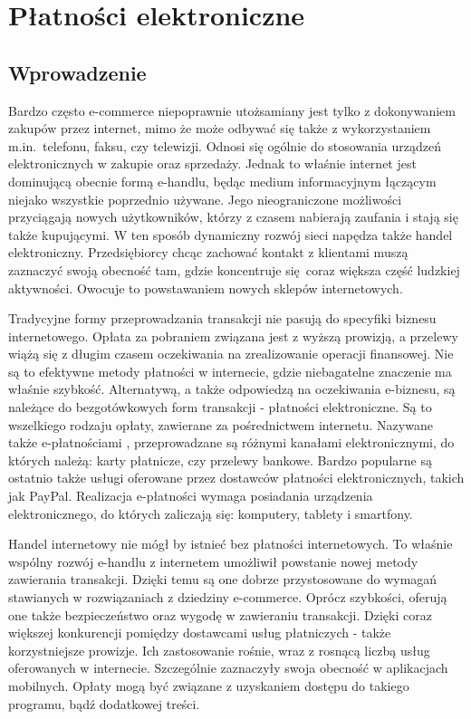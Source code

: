 \section{Płatności elektroniczne}


\subsection{Wprowadzenie}

Bardzo często e-commerce niepoprawnie utożsamiany jest tylko z dokonywaniem zakupów przez internet, mimo że może odbywać się także z wykorzystaniem m.in.~telefonu, faksu, czy telewizji. Odnosi się ogólnie do stosowania urządzeń elektronicznych w zakupie oraz sprzedaży. Jednak to właśnie internet jest dominującą obecnie formą e-handlu, będąc medium informacyjnym łączącym niejako wszystkie poprzednio używane. Jego nieograniczone możliwości przyciągają nowych użytkowników, którzy z czasem nabierają zaufania i stają się także kupującymi. W ten sposób dynamiczny rozwój sieci napędza także handel elektroniczny. Przedsiębiorcy chcąc zachować kontakt z klientami muszą zaznaczyć swoją obecność tam, gdzie koncentruje się coraz większa część ludzkiej aktywności. Owocuje to powstawaniem nowych sklepów internetowych.

Tradycyjne formy przeprowadzania transakcji nie pasują do specyfiki biznesu internetowego. Opłata za pobraniem związana jest z wyższą prowizją, a przelewy wiążą się z długim czasem oczekiwania na zrealizowanie operacji finansowej. Nie są to efektywne metody płatności w internecie, gdzie niebagatelne znaczenie ma właśnie szybkość. Alternatywą, a także odpowiedzą na oczekiwania e-biznesu, są należące do bezgotówkowych form transakcji - płatności elektroniczne. Są to wszelkiego rodzaju opłaty, zawierane za pośrednictwem internetu. Nazywane także e-płatnościami \cite{elektroniczne_metody_platnosci}, przeprowadzane są różnymi kanałami elektronicznymi, do których należą: karty płatnicze, czy przelewy bankowe. Bardzo popularne są ostatnio także usługi oferowane przez dostawców płatności elektronicznych, takich jak PayPal. Realizacja e-płatności wymaga posiadania urządzenia elektronicznego, do których zaliczają się: komputery, tablety i smartfony. 

Handel internetowy nie mógł by istnieć bez płatności internetowych. To właśnie wspólny rozwój e-handlu z internetem umożliwił powstanie nowej metody zawierania transakcji. Dzięki temu są one dobrze przystosowane do wymagań stawianych w rozwiązaniach z dziedziny e-commerce. Oprócz szybkości, oferują one także bezpieczeństwo oraz wygodę w zawieraniu transakcji. Dzięki coraz większej konkurencji pomiędzy dostawcami usług płatniczych - także korzystniejsze prowizje. Ich zastosowanie rośnie, wraz z rosnącą liczbą usług oferowanych w internecie. Szczególnie zaznaczyły swoja obecność w aplikacjach mobilnych. Opłaty mogą być związane z uzyskaniem dostępu do takiego programu, bądź dodatkowej treści.

